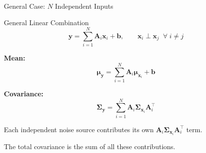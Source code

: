 \documentclass[aspectratio=169, 11pt]{beamer}
\newcommand{\T}{^{\top}}
\begin{document}
\begin{frame}{General Case: $N$ Independent Inputs}

\begin{block}{General Linear Combination}
$$\mathbf{y} = \sum_{i=1}^{N} \mathbf{A}_i \mathbf{x}_i + \mathbf{b}, \qquad \mathbf{x}_i \perp \mathbf{x}_j \;\;\forall\; i \neq j$$
\end{block}

\vspace{6pt}

\textbf{Mean:}
$$\bm{\mu}_{\mathbf{y}} = \sum_{i=1}^{N} \mathbf{A}_i \bm{\mu}_{\mathbf{x}_i} + \mathbf{b}$$

\vspace{4pt}

\textbf{Covariance:}
$$\boxed{\bm{\Sigma}_{\mathbf{y}} = \sum_{i=1}^{N} \mathbf{A}_i \bm{\Sigma}_{\mathbf{x}_i} \mathbf{A}_i\T}$$

\vspace{6pt}

Each independent noise source contributes its own $\mathbf{A}_i \bm{\Sigma}_{\mathbf{x}_i} \mathbf{A}_i\T$ term.

The total covariance is the sum of all these contributions.

\end{frame}
\end{document}
